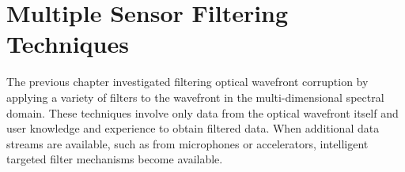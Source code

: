 
\chapter{Multiple Sensor Filtering Techniques}
\label{chap:07_multiple_filter}

The previous chapter investigated filtering optical wavefront corruption by applying a variety of filters to the wavefront in the multi-dimensional spectral domain.
These techniques involve only data from the optical wavefront itself and user knowledge and experience to obtain filtered data.
When additional data streams are available, such as from microphones or accelerators, intelligent targeted filter mechanisms become available.
